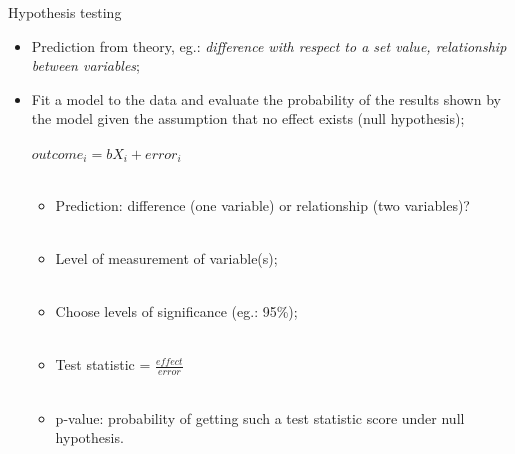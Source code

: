 \documentclass[10pt]{beamer}   %
\begin{document}
\begin{frame}{Hypothesis testing}

\begin{itemize}

\item Prediction from theory, eg.: \textit{difference with respect to a set value, relationship between variables}; 

\item Fit a model to the data and evaluate the probability of the results shown by the model given the assumption that no effect exists (null hypothesis); \\~\\

 $outcome_i=bX_i+error_i$  \\~\\

\begin{itemize}

\item Prediction: difference (one variable) or relationship (two variables)? \\~\\

\item Level of measurement of variable(s);  \\~\\

\item Choose levels of significance (eg.: 95\%);  \\~\\

\item Test statistic = $\frac{effect}{error}$  \\~\\

\item p-value: probability of getting such a test statistic score under null hypothesis.

\end{itemize}



\end{itemize}

\end{frame}


\end{document}
